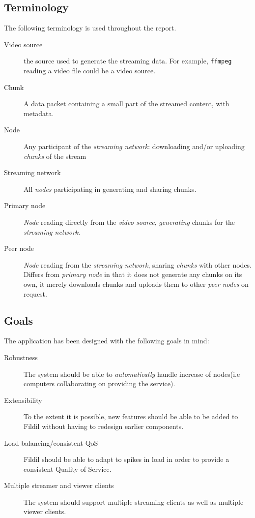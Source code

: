 \documentclass[10pt, a4paper]{article}
\begin{document}
\subsection{Terminology}
\label{sec:terminology}

The following terminology is used throughout the report.

\begin{description}
\item[Video source] the source used to generate the streaming data. For example,
  \texttt{ffmpeg} reading a video file could be a video source.
\item[Chunk] A data packet containing a small part of the streamed
  content, with metadata.
\item[Node] Any participant of the \emph{streaming network}: downloading and/or
  uploading \emph{chunks} of the stream
\item[Streaming network] All \emph{nodes} participating in generating and
  sharing chunks.
\item[Primary node] \emph{Node} reading directly from the \emph{video source},
  \emph{generating} chunks for the \emph{streaming network}.
\item[Peer node] \emph{Node} reading from the \emph{streaming network}, sharing
  \emph{chunks} with other nodes. Differs from \emph{primary node} in that it
  does not generate any chunks on its own, it merely downloads chunks and
  uploads them to other \emph{peer nodes} on request.
\end{description}

\subsection{Goals}
\label{sec:goals}

The application has been designed with the following goals in mind:

\begin{description}
\item[Robustness] The system should be able to \emph{automatically} handle
  increase of nodes(i.e computers collaborating on providing the service).
\item[Extensibility] To the extent it is possible, new features should be able
  to be added to Fildil without having to redesign earlier components.
\item[Load balancing/consistent QoS] Fildil should be able to adapt to spikes in
  load in order to provide a consistent Quality of Service.
\item [Multiple streamer and viewer clients] The system should support multiple
  streaming clients as well as multiple viewer clients.
\end{description}
\end{document}
